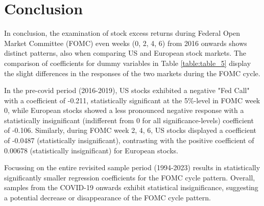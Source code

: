 



%

\chapter{Conclusion}
In conclusion, the examination of stock excess returns during Federal Open Market Committee (FOMC) even weeks (0, 2, 4, 6) from 2016 onwards shows distinct patterns, also when comparing US and European stock markets. The comparison of coefficients for dummy variables in Table \ref{table:table_5} display the slight differences in the responses of the two markets during the FOMC cycle.  

In the pre-covid period (2016-2019),  US stocks exhibited a negative "Fed Call" with a coefficient of -0.211, statistically significant at the 5\%-level in FOMC week 0, while European stocks showed a less pronounced negative response with a statistically insignificant (indifferent from 0 for all significance-levels) coefficient of -0.106. Similarly, during FOMC week 2, 4, 6, US stocks displayed a coefficient of -0.0487 (statistically insignificant),  contrasting with the positive coefficient of 0.00678 (statistically insignificant) for European stocks. 

Focussing on the entire revisited sample period (1994-2023) results in statistically significantly smaller regression coefficients for the FOMC cycle pattern.  Overall, samples from the COVID-19 onwards exhibit statistical insignificance,  suggesting a potential decrease or disappearance of the FOMC cycle pattern.




